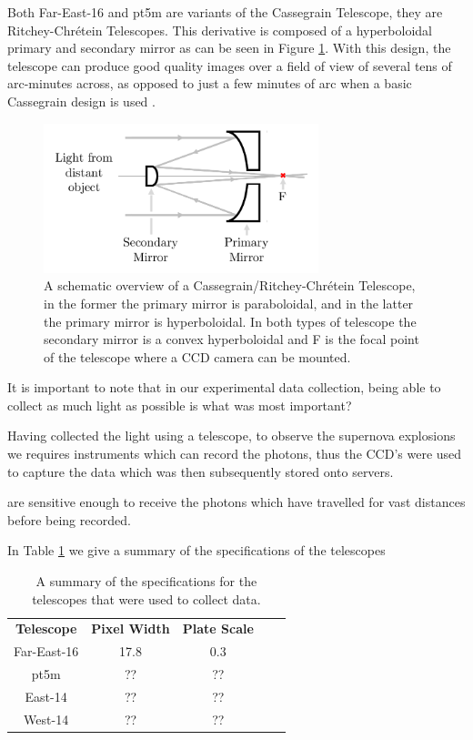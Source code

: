 \documentclass[twocolumn]{revtex4}
\newcommand{\squeezeup}{\vspace{-2.5mm}}
\begin{document}
Both Far-East-16 and pt5m are variants of the Cassegrain Telescope, they are Ritchey-Chr\'{e}tein Telescopes. This derivative is composed of a hyperboloidal primary and secondary mirror \cite{tel_tech} as can be seen in Figure \ref{cassegrain}. With this design, the telescope can produce good quality images over a field of view of several tens of arc-minutes across, as opposed to just a few minutes of arc when a basic Cassegrain design is used \cite{tel_tech}. 
\squeezeup
\begin{figure}[!h]
\begin{center}
\includegraphics[width=8cm]{observations/cassegrain}
\caption[]{A schematic overview of a Cassegrain/Ritchey-Chr\'{e}tein Telescope, in the former the primary mirror is paraboloidal, and in the latter the primary mirror is hyperboloidal. In both types of telescope the secondary mirror is a convex hyperboloidal and F is the focal point of the telescope where a CCD camera can be mounted.}
\label{cassegrain}
\end{center}
\end{figure}
\squeezeup
\squeezeup

It is important to note that in our experimental data collection, being able to collect as much light as possible is what was most important?

Having collected the light using a telescope, to observe the supernova explosions we requires instruments which can record the photons, thus the CCD's were used to capture the data which was then subsequently stored onto servers. 

are sensitive enough to receive the photons which have travelled for vast distances before being recorded. 

In Table \ref{telescope-ccd-specs} we give a summary of the specifications of the telescopes
\begin{table}[h!]
\centering
\begin{tabular}{c@{\hskip 20pt}c@{\hskip 20pt}c@{\hskip 20pt}c@{\hskip 20pt}c} 
 \hline
 \textbf{Telescope} & \textbf{Pixel Width} & \textbf{Plate Scale} \\ [0.5ex] 
 Far-East-16 & 17.8 & 0.3 \\
 pt5m & ?? & ?? \\
 East-14 & ?? & ?? \\
 West-14 & ?? & ?? \\
 \hline
\end{tabular}
\caption{A summary of the specifications for the telescopes that were used to collect data.}
\label{telescope-ccd-specs}
\end{table}
\end{document}
